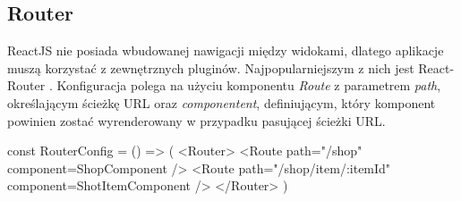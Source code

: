 	 \subsection{Router}
	 ReactJS nie posiada wbudowanej nawigacji między widokami, dlatego aplikacje muszą korzystać z zewnętrznych pluginów. Najpopularniejszym z nich jest React-Router \cite{reactjs-router}. Konfiguracja polega na użyciu komponentu \textit{Route} z parametrem \textit{path}, określającym ścieżkę URL oraz \textit{componentent}, definiującym, który komponent powinien zostać wyrenderowany w przypadku pasującej ścieżki URL.
	 
	 \begin{code}[
		language=javascript,
		caption={Konfiguracja Routera w ReactJS (źródło: opracowanie własne)},
		label={lis:reactjs-router},
		escapechar=|
	]
const RouterConfig = () => (
  <Router>
    <Route path="/shop" component={ShopComponent} />
    <Route path="/shop/item/:itemId" component={ShotItemComponent} />
  </Router>
)
	\end{code}